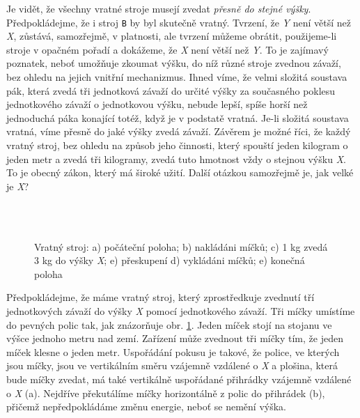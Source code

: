     Je vidět, že všechny vratné stroje musejí zvedat \emph{přesně do stejné výšky}. Předpokládejme, 
    že i stroj \texttt{B} by byl skutečně vratný. Tvrzení, že \emph{Y} není větší než \emph{X}, 
    zůstává, samozřejmě, v platnosti, ale tvrzení můžeme obrátit, použijeme-li stroje v opačném 
    pořadí a dokážeme, že \emph{X} není větší než \emph{Y}. To je zajímavý poznatek, neboť umožňuje 
    zkoumat výšku, do níž různé stroje zvednou závaží, bez ohledu na jejich vnitřní mechanizmus. 
    Ihned víme, že velmi složitá soustava pák, která zvedá tři jednotková závaží do určité výšky za 
    současného poklesu jednotkového závaží o jednotkovou výšku, nebude lepší, spíše horší než 
    jednoduchá páka konající totéž, když je v podstatě vratná. Je-li složitá soustava vratná, víme 
    přesně do jaké výšky zvedá závaží. Závěrem je možné říci, že každý vratný stroj, bez ohledu na 
    způsob jeho činnosti, který spouští jeden kilogram o jeden metr a zvedá tři kilogramy, zvedá 
    tuto hmotnost vždy o stejnou výšku \emph{X}. To je obecný zákon, který má široké užití. Další 
    otázkou samozřejmě je, jak velké je \emph{X}?

    \begin{figure}[ht!]  %
      \centering
      \hspace{1em}                                                       
      \hspace{1em}                                                       
      \\     
      \\                  
      \hspace{1em}                                                       
      \caption{Vratný stroj: a) počáteční poloha; b) nakládáni míčků; c) 1 kg zvedá 3 kg do výšky 
              \emph{X}; e) přeskupení  d) vykládáni míčků; e) konečná poloha 
              \cite[s.~53]{Feynman01}}
      \label{fyz:fig049}
    \end{figure}
    
    Předpokládejme, že máme vratný stroj, který zprostředkuje zvednutí tří jednotkových závaží do 
    výšky \emph{X} pomocí jednotkového závaží. Tři míčky umístíme do pevných polic tak, jak 
    znázorňuje obr. \ref{fyz:fig049}. Jeden míček stojí na stojanu ve výšce jednoho metru nad zemí. 
    Zařízení může zvednout tři míčky tím, že jeden míček klesne o jeden metr. Uspořádání pokusu je 
    takové, že police, ve kterých jsou míčky, jsou ve vertikálním směru vzájemně vzdálené o 
    \emph{X} a plošina, která bude míčky zvedat, má také vertikálně uspořádané přihrádky vzájemně 
    vzdálené o \emph{X} (a). Nejdříve překutálíme míčky horizontálně z polic do přihrádek (b), 
    přičemž nepředpokládáme změnu energie, neboť se nemění výška.

